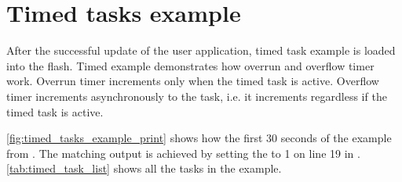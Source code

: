 \section{Timed tasks example}

After the successful update of the user application, timed task example is loaded into the flash. Timed example demonstrates how overrun and overflow timer work. Overrun timer increments only when the timed task is active. Overflow timer increments asynchronously to the task, i.e. it increments regardless if the timed task is active. 

\autoref{fig:timed_tasks_example_print} shows how the first 30 seconds of the example from . The matching output is achieved by setting the  to 1 on line 19 in . \autoref{tab:timed_task_list} shows all the tasks in the example.

\begin{table}[H]
\centering
\caption{All timed tasks in demonstration}
\label{tab:timed_task_list}
\end{table}

